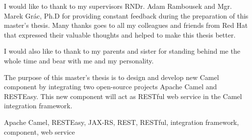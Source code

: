\documentclass[12pt,final,oneside]{fithesis2}
\begin{document}

\begin{ThesisDeclaration}
  \DeclarationText
  \AdvisorName
\end{ThesisDeclaration}

\begin{ThesisThanks}
I would like to thank to my supervisors RNDr. Adam Rambousek and Mgr. Marek Grác, Ph.D
for providing constant feedback during the preparation of this master’s
thesis. Many thanks goes to all my colleagues and friends from Red Hat that
expressed their valuable thoughts and helped to make this thesis better.

I would also like to thank to my parents and sister for standing behind me the whole time and bear with me and my personality.
\end{ThesisThanks}

\begin{ThesisAbstract}
The purpose of this master’s thesis is to design and develop new Camel
component by integrating two open-source projects Apache Camel and
RESTEasy. This new component will act as RESTful web service in
the Camel integration framework.
\end{ThesisAbstract}

\begin{ThesisKeyWords}
Apache Camel, RESTEasy, JAX-RS, REST, RESTful, integration framework, component, web service

\end{ThesisKeyWords}

\MainMatter

\tableofcontents

\end{document}
